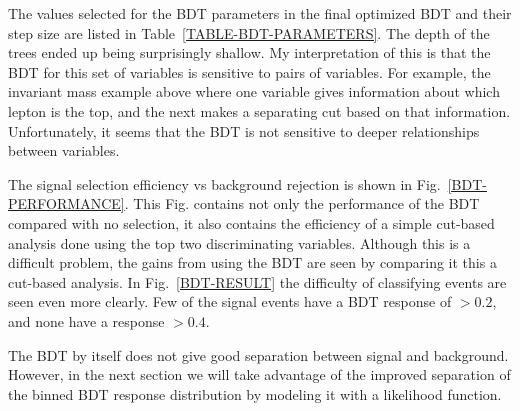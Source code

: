 The values selected for the BDT parameters in the final optimized BDT and their step size are listed in Table~\ref{TABLE-BDT-PARAMETERS}. The depth of the trees ended up being surprisingly shallow. My interpretation of this is that the BDT for this set of variables is sensitive to pairs of variables. For example, the invariant mass example above where one variable gives information about which lepton is the top, and the next makes a separating cut based on that information. Unfortunately, it seems that the BDT is not sensitive to deeper relationships between variables.



The signal selection efficiency vs background rejection is shown in Fig.~\ref{BDT-PERFORMANCE}. This Fig. contains not only the performance of the BDT compared with no selection, it also contains the efficiency of a simple cut-based analysis done using the top two discriminating variables. Although this is a difficult problem, the gains from using the BDT are seen by comparing it this a cut-based analysis. In Fig.~\ref{BDT-RESULT} the difficulty of classifying events are seen even more clearly. Few of the signal events have a BDT response of $> 0.2$, and none have a response $> 0.4$. 

The BDT by itself does not give good separation between signal and background. However, in the next section we will take advantage of the improved separation of the binned BDT response distribution by modeling it with a likelihood function. 
